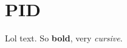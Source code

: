 \documentclass[Main]{subfiles}
\begin{document}
\section{PID} %
	\label{sec:pid}

	Lol text.
	So \textbf{bold}, very \emph{cursive}.

\end{document}
